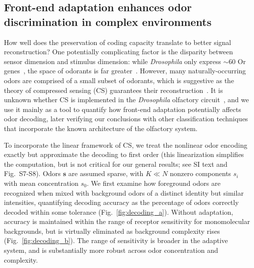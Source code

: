 \documentclass[9pt,twocolumn,twoside]{pnas-new}
\begin{document}
\subsection*{Front-end adaptation enhances odor discrimination in complex environments}

How well does the preservation of coding capacity translate to better signal reconstruction?
One potentially complicating factor is the disparity between sensor dimension and stimulus dimension: while \textit{Drosophila} only express $\sim 60$ Or genes~\cite{olfactory_sensory_map}, the space of odorants is far greater~\cite{vijay_1}. However, many naturally-occurring odors are comprised of a small subset of odorants, which is suggestive as the theory of compressed sensing (CS) guarantees their reconstruction~\cite{CS_donoho, CS_tao}. It is unknown whether CS is implemented in the \textit{Drosophila} olfactory circuit~\cite{chlovskii_pevlavan}, and we use it mainly as a tool to quantify how front-end adaptation potentially affects odor decoding, later verifying our conclusions with other classification techniques that incorporate the known architecture of the olfactory system. 

To incorporate the linear framework of CS, we treat the nonlinear odor encoding exactly but approximate the decoding to first order (this  linearization simplifies the computation, but is not critical for our general results; see SI text and Fig.~S7-S8). Odors $\mathbf s$ are assumed sparse, with $K \ll N$ nonzero components $s_i$ with mean concentration  $s_0$. We first examine how foreground odors are recognized when mixed with background odors of a distinct identity but similar intensities, quantifying decoding accuracy as the percentage of odors correctly decoded within some tolerance (Fig.~\ref{fig:decoding_a}). Without adaptation, accuracy is maintained within the range of receptor sensitivity for monomolecular backgrounds, but is virtually eliminated as background complexity rises (Fig.~\ref{fig:decoding_b}). The range of sensitivity is broader in the adaptive system, and is substantially more robust across odor concentration and complexity. 
\end{document}
